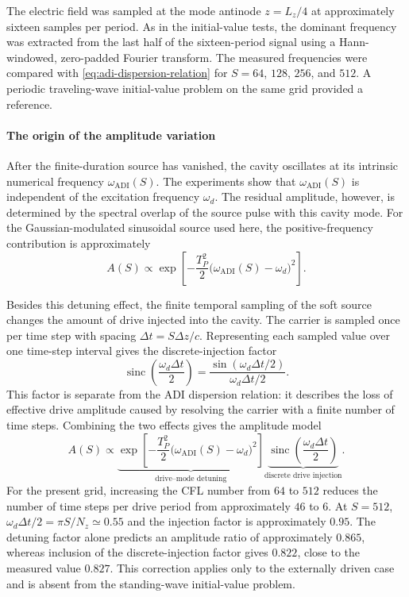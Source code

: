 \documentclass{article}
\numberwithin{equation}{section}
\numberwithin{figure}{section}
\begin{document}
The electric field was sampled at the mode antinode $z=L_z/4$ at approximately sixteen samples per period. As in the initial-value tests, the dominant frequency was extracted from the last half of the sixteen-period signal using a Hann-windowed, zero-padded Fourier transform. The measured frequencies were compared with \eqref{eq:adi-dispersion-relation} for $S=64$, $128$, $256$, and $512$. A periodic traveling-wave initial-value problem on the same grid provided a reference.


\paragraph{The origin of the amplitude variation}
After the finite-duration source has vanished, the cavity oscillates at its intrinsic numerical frequency $\omega_{\mathrm{ADI}}(S)$. The experiments show that $\omega_{\mathrm{ADI}}(S)$ is independent of the excitation frequency $\omega_d$. The residual amplitude, however, is determined by the spectral overlap of the source pulse with this cavity mode. For the Gaussian-modulated sinusoidal source used here, the positive-frequency contribution is approximately
\begin{equation}
    A(S)\propto
    \exp\!\left[
        -\frac{T_P^2}{2}
        \bigl(\omega_{\mathrm{ADI}}(S)-\omega_d\bigr)^2
        \right].
\end{equation}

Besides this detuning effect, the finite temporal sampling of the soft source changes the amount of drive injected into the cavity. The carrier is sampled once per time step with spacing $\Delta t=S\Delta z/c$. Representing each sampled value over one time-step interval gives the discrete-injection factor
\begin{equation}
    \operatorname{sinc}\!\left(\frac{\omega_d\Delta t}{2}\right)
    =
    \frac{\sin(\omega_d\Delta t/2)}{\omega_d\Delta t/2}.
\end{equation}
This factor is separate from the ADI dispersion relation: it describes the loss of effective drive amplitude caused by resolving the carrier with a finite number of time steps. Combining the two effects gives the amplitude model
\begin{equation}
    A(S)\propto
    \underbrace{
        \exp\!\left[
            -\frac{T_P^2}{2}
            \bigl(\omega_{\mathrm{ADI}}(S)-\omega_d\bigr)^2
            \right]
    }_{\text{drive--mode detuning}}
    \underbrace{
        \operatorname{sinc}\!\left(\frac{\omega_d\Delta t}{2}\right)
    }_{\text{discrete drive injection}}.
\end{equation}
For the present grid, increasing the CFL number from $64$ to $512$ reduces the number of time steps per drive period from approximately $46$ to $6$. At $S=512$, $\omega_d\Delta t/2=\pi S/N_z\simeq0.55$ and the injection factor is approximately $0.95$. The detuning factor alone predicts an amplitude ratio of approximately $0.865$, whereas inclusion of the discrete-injection factor gives $0.822$, close to the measured value $0.827$. This correction applies only to the externally driven case and is absent from the standing-wave initial-value problem.
\end{document}
